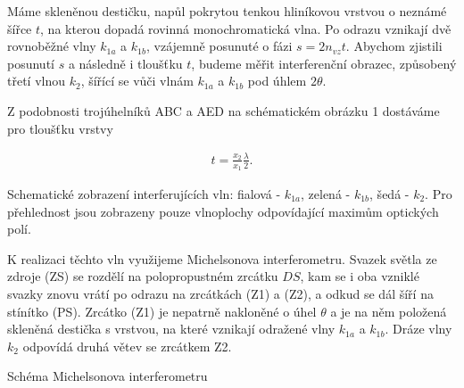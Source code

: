 \documentclass[a4paper,11pt]{article}
\begin{document}
Máme skleněnou destičku, napůl pokrytou tenkou hliníkovou vrstvou o neznámé šířce $ t $, na kterou dopadá rovinná monochromatická vlna. Po odrazu vznikají dvě rovnoběžné vlny $ k_{1a} $ a $ k_{1b} $, vzájemně posunuté o fázi $ s = 2 n_{vz} t $. Abychom zjistili posunutí $ s $ a následně i tloušťku $ t $, budeme měřit interferenční obrazec, způsobený třetí vlnou $ k_2 $, šířící se vůči vlnám $ k_{1a} $ a $ k_{1b} $ pod úhlem $ 2 \theta $.

Z podobnosti trojúhelníků ABC a AED na schématickém obrázku 1 dostáváme pro tloušťku vrstvy 

\begin{align}
    t = \frac{x_2}{x_1} \frac{\lambda}{2}.
\end{align}

\begin{table}[htpb]
    \hfill
    \begin{minipage}[b]{.28\linewidth}
        \centering
    \end{minipage} 
    \begin{minipage}[b]{.28\linewidth}
        \centering
    \end{minipage} 
    \hfill
    \captionsetup{type=figure}
    \caption{Schematické zobrazení interferujících vln: fialová - $ k_{1a} $, zelená - $ k_{1b} $, šedá - $ k_2 $. Pro přehlednost jsou zobrazeny pouze vlnoplochy odpovídající maximům optických polí.}
\end{table}

K realizaci těchto vln využijeme Michelsonova interferometru. Svazek světla ze zdroje (ZS) se rozdělí na polopropustném zrcátku $ DS $, kam se i oba vzniklé svazky znovu vrátí po odrazu na zrcátkách (Z1) a (Z2), a odkud se dál šíří na stínítko (PS). Zrcátko (Z1) je nepatrně nakloněné o úhel $ \theta $ a je na něm položená skleněná destička s vrstvou, na které vznikají odražené vlny $ k_{1a} $ a $ k_{1b} $. Dráze vlny $ k_2 $ odpovídá druhá větev se zrcátkem Z2.

\begin{table}[htpb]
    \begin{minipage}[b]{.45\linewidth}
        \centering
    \end{minipage} 
    \hfill
    \begin{minipage}[b]{.45\linewidth}
        \centering
    \end{minipage} 
    \captionsetup{type=figure}
    \caption{Schéma Michelsonova interferometru}
\end{table}
\end{document}
